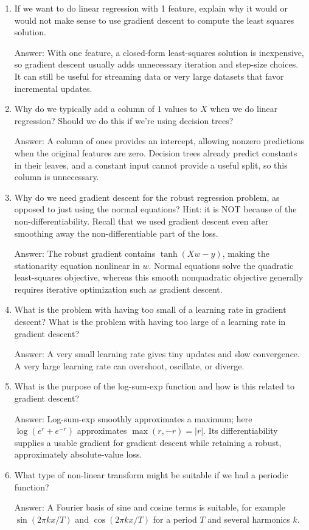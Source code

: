 \documentclass{article}
\newcommand{\gre}[1]{\textcolor{gre}{#1}}
\newcommand\ans[1]{\par\gre{Answer: #1}}
\begin{document}
\begin{enumerate}
\item If we want to do linear regression with 1 feature, explain why it would or would not make sense to use gradient descent to compute the least squares solution.
\ans{With one feature, a closed-form least-squares solution is inexpensive, so gradient descent usually adds unnecessary iteration and step-size choices. It can still be useful for streaming data or very large datasets that favor incremental updates.}

\item Why do we typically add a column of $1$ values to $X$ when we do linear regression? Should we do this if we're using decision trees?
\ans{A column of ones provides an intercept, allowing nonzero predictions when the original features are zero. Decision trees already predict constants in their leaves, and a constant input cannot provide a useful split, so this column is unnecessary.}

\item Why do we need gradient descent for the robust regression problem, as opposed to just using the normal equations? Hint: it is NOT because of the non-differentiability. Recall that we used gradient descent even after smoothing away the non-differentiable part of the loss.
\ans{The robust gradient contains $\tanh(Xw-y)$, making the stationarity equation nonlinear in $w$. Normal equations solve the quadratic least-squares objective, whereas this smooth nonquadratic objective generally requires iterative optimization such as gradient descent.}

\item What is the problem with having too small of a learning rate in gradient descent? What is the problem with having too large of a learning rate in gradient descent?
\ans{A very small learning rate gives tiny updates and slow convergence. A very large learning rate can overshoot, oscillate, or diverge.}

\item What is the purpose of the log-sum-exp function and how is this related to gradient descent?
\ans{Log-sum-exp smoothly approximates a maximum; here $\log(e^r+e^{-r})$ approximates $\max(r,-r)=|r|$. Its differentiability supplies a usable gradient for gradient descent while retaining a robust, approximately absolute-value loss.}

\item What type of non-linear transform might be suitable if we had a periodic function?

\ans{A Fourier basis of sine and cosine terms is suitable, for example $\sin(2\pi kx/T)$ and $\cos(2\pi kx/T)$ for a period $T$ and several harmonics $k$.}

\end{enumerate}
\end{document}

